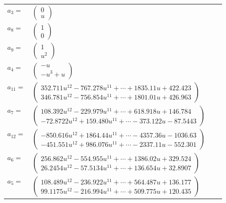 \documentclass[1p]{elsarticle_modified}
\theoremstyle{definition}
\begin{document}
\begin{tabular}{m{7pt} m{180pt} m{7pt} m{180pt} }
\flushright $a_{3}=$&$\begin{pmatrix}0\\u\end{pmatrix}$ \\
\flushright $a_{8}=$&$\begin{pmatrix}1\\0\end{pmatrix}$ \\
\flushright $a_{9}=$&$\begin{pmatrix}1\\u^2\end{pmatrix}$ \\
\flushright $a_{4}=$&$\begin{pmatrix}- u\\- u^3+u\end{pmatrix}$ \\
\flushright $a_{11}=$&$\begin{pmatrix}352.711 u^{12}-767.278 u^{11}+\cdots+1835.11 u+422.423\\346.781 u^{12}-756.854 u^{11}+\cdots+1801.01 u+426.963\end{pmatrix}$ \\
\flushright $a_{7}=$&$\begin{pmatrix}108.392 u^{12}-229.979 u^{11}+\cdots+618.918 u+146.784\\-72.8722 u^{12}+159.480 u^{11}+\cdots-373.122 u-87.5443\end{pmatrix}$ \\
\flushright $a_{12}=$&$\begin{pmatrix}-850.616 u^{12}+1864.44 u^{11}+\cdots-4357.36 u-1036.63\\-451.551 u^{12}+986.076 u^{11}+\cdots-2337.11 u-552.301\end{pmatrix}$ \\
\flushright $a_{6}=$&$\begin{pmatrix}256.862 u^{12}-554.955 u^{11}+\cdots+1386.02 u+329.524\\26.2454 u^{12}-57.5134 u^{11}+\cdots+136.654 u+32.8907\end{pmatrix}$ \\
\flushright $a_{5}=$&$\begin{pmatrix}108.489 u^{12}-236.922 u^{11}+\cdots+564.487 u+136.177\\99.1175 u^{12}-216.994 u^{11}+\cdots+509.775 u+120.435\end{pmatrix}$ \\

\end{tabular}
\end{document}
